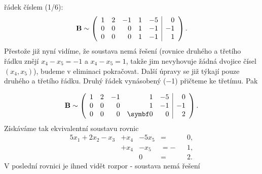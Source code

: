 \begin{mdframed}[style=mdexam]
\begin{example}
    řádek číslem (\num{1/6}):
    \begingroup
      \renewcommand\arraystretch{1.0}
      \renewcommand\arraycolsep{3pt}    
      \begin{equation*}
        \mathbf{B} \sim
        \left(
          \begin{array}{rrrrr|r}
                  1 &  2 & -1 & 1 & -5 &  0    \\
                  0 &  0 &  0 & 1 & -1 & -1    \\
                  0 &  0 &  0 & 1 & -1 &  1
          \end{array}
        \right).
      \end{equation*}
    \endgroup  
    Přestože již nyní vidíme, že soustava nemá řešení (rovnice druhého a třetího řádku znějí \(x_4 -
    x_5 = - 1\) a \(x_4 -x_5 = 1\), takže jim nevyhovuje žádná dvojice čísel \((x_4, x_5)\)), budeme
    v eliminaci pokračovat. Další úpravy se již týkají pouze druhého a třetího řádku. Druhý řádek
    vynásobený (\num{-1}) přičteme ke třetímu. Pak

    \begingroup
    \renewcommand\arraystretch{1.0}
    \renewcommand\arraycolsep{3pt}
      \begin{equation*}
        \matr{B} \sim
        \left(
          \begin{array}{rrrrr|r}
                  1 &  2 & -1 & 1      & -5 &  0    \\
                  0 &  0 &  0 & 1      & -1 & -1    \\
                  0 &  0 &  0 & \bm{0} &  0 &  2
          \end{array}
        \right).
      \end{equation*}
    \endgroup  
    Získáváme tak ekvivalentní soustavu rovnic
    \begin{alignat*}{5}
          x_1 + 2x_2 - x_3 &+  x_4 &- 5x_5 &=  &&0, \\
                            &+  x_4 &-  x_5 &= -&&1, \\
                            &       &     0 &=  &&2.
    \end{alignat*}
    V poslední rovnici je ihned vidět rozpor - soustava nemá řešení
  \end{example}
\end{mdframed}